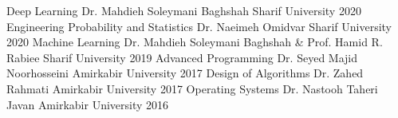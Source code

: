 

\begin{cvhonors}
    \cvhonor
    {Deep Learning} %
    {Dr. Mahdieh Soleymani Baghshah} %
    {Sharif University} %
    {2020} %
    \cvhonor
    { Engineering Probability and Statistics} %
    {Dr. Naeimeh Omidvar} %
    {Sharif University} %
    {2020} %
	\cvhonor
	{Machine Learning} %
	{Dr. Mahdieh Soleymani Baghshah \& Prof. Hamid R. Rabiee} %
	{Sharif University} %
	{2019} %
	\cvhonor
	{Advanced Programming} %
	{Dr. Seyed Majid Noorhosseini} %
	{Amirkabir University} %
	{2017} %
	\cvhonor
	{Design of Algorithms} %
	{Dr. Zahed Rahmati} %
	{Amirkabir University} %
	{2017} %
	\cvhonor
	{Operating Systems} %
	{Dr. Nastooh Taheri Javan} %
	{Amirkabir University} %
	{2016} %
\end{cvhonors}